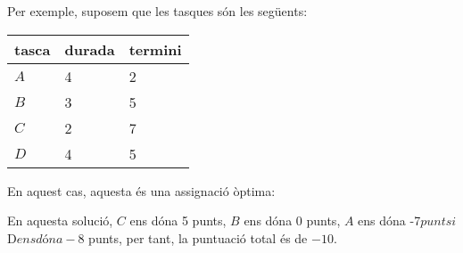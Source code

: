 Per exemple, suposem que les tasques són les següents:
\begin{center}
\begin{tabular}{lll}
tasca & durada & termini \\
\hline
$A$ & 4 & 2 \\
$B$ & 3 & 5 \\
$C$ & 2 & 7 \\
$D$ & 4 & 5 \\
\end{tabular}
\end{center}
En aquest cas, aquesta és una assignació òptima:
\begin{center}
\end{center}
En aquesta solució, $C$ ens dóna 5 punts,
$B$ ens dóna 0 punts, $A$ ens dóna -7$ punts
i $D$ ens dóna -8$ punts,
per tant, la puntuació total és de $-10$.

